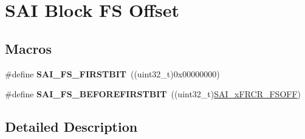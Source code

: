 \hypertarget{group___s_a_i___block___f_s___offset}{}\section{S\+AI Block FS Offset}
\label{group___s_a_i___block___f_s___offset}
\subsection*{Macros}
\begin{DoxyCompactItemize}
\item 
\#define {\bfseries S\+A\+I\+\_\+\+F\+S\+\_\+\+F\+I\+R\+S\+T\+B\+IT}~((uint32\+\_\+t)0x00000000)\hypertarget{group___s_a_i___block___f_s___offset_ga8369e78cdc309bbb099cf42430a7077d}{}\label{group___s_a_i___block___f_s___offset_ga8369e78cdc309bbb099cf42430a7077d}

\item 
\#define {\bfseries S\+A\+I\+\_\+\+F\+S\+\_\+\+B\+E\+F\+O\+R\+E\+F\+I\+R\+S\+T\+B\+IT}~((uint32\+\_\+t)\hyperlink{group___peripheral___registers___bits___definition_ga250708d79ab12828bb6388390790a406}{S\+A\+I\+\_\+x\+F\+R\+C\+R\+\_\+\+F\+S\+O\+FF})\hypertarget{group___s_a_i___block___f_s___offset_gacbbeb39298fb322b13d422969e158f87}{}\label{group___s_a_i___block___f_s___offset_gacbbeb39298fb322b13d422969e158f87}

\end{DoxyCompactItemize}


\subsection{Detailed Description}
